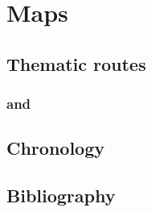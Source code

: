 \chapter{Maps}

\section{Thematic routes}
\subsection{\separake}
\subsection{\mirage}
\subsection{\lantern}
\subsection{\dechorate}
\subsection{\blaster and }

\section{Chronology}

\section{Bibliography}
